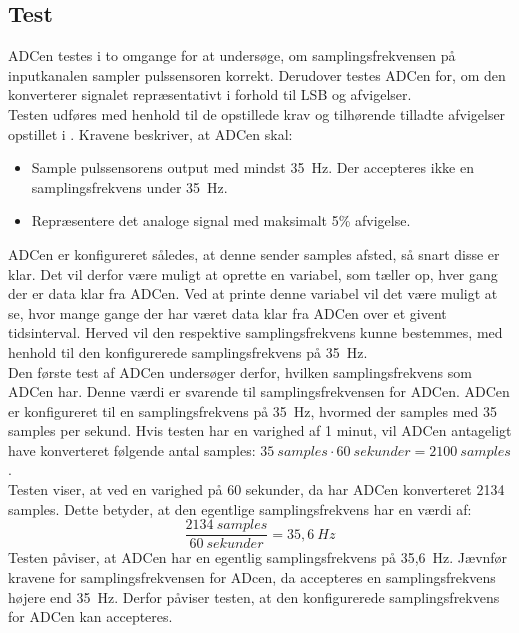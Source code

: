\subsection{Test}
ADCen testes i to omgange for at undersøge, om samplingsfrekvensen på inputkanalen sampler pulssensoren korrekt. Derudover testes ADCen for, om den konverterer signalet repræsentativt i forhold til LSB og afvigelser. \\
Testen udføres med henhold til de opstillede krav og tilhørende tilladte afvigelser opstillet i . Kravene beskriver, at ADCen skal:
\begin{itemize}
	\item Sample pulssensorens output med mindst 35~Hz. Der accepteres ikke en samplingsfrekvens under 35~Hz. 
	\item Repræsentere det analoge signal med maksimalt 5\% afvigelse. 
\end{itemize}

ADCen er konfigureret således, at denne sender samples afsted, så snart disse er klar. Det vil derfor være muligt at oprette en variabel, som tæller op, hver gang der er data klar fra ADCen. Ved at printe denne variabel vil det være muligt at se, hvor mange gange der har været data klar fra ADCen over et givent tidsinterval. Herved vil den respektive samplingsfrekvens kunne bestemmes, med henhold til den konfigurerede samplingsfrekvens på 35~Hz. \\
Den første test af ADCen undersøger derfor, hvilken samplingsfrekvens som ADCen har. Denne værdi er svarende til samplingsfrekvensen for ADCen. ADCen er konfigureret til en samplingsfrekvens på 35~Hz, hvormed der samples med 35 samples per sekund. Hvis testen har en varighed af 1 minut, vil ADCen antageligt have konverteret følgende antal samples: $35~samples \cdot 60~sekunder = 2100~samples$. \\
Testen viser, at ved en varighed på 60 sekunder, da har ADCen konverteret 2134 samples. Dette betyder, at den egentlige samplingsfrekvens har en værdi af:
\begin{equation}
\frac{2134~samples}{60~sekunder} = 35,6~Hz 
\end{equation}
Testen påviser, at ADCen har en egentlig samplingsfrekvens på 35,6~Hz. Jævnfør kravene for samplingsfrekvensen for ADcen, da accepteres en samplingsfrekvens højere end 35~Hz. Derfor påviser testen, at den konfigurerede samplingsfrekvens for ADCen kan accepteres. 

